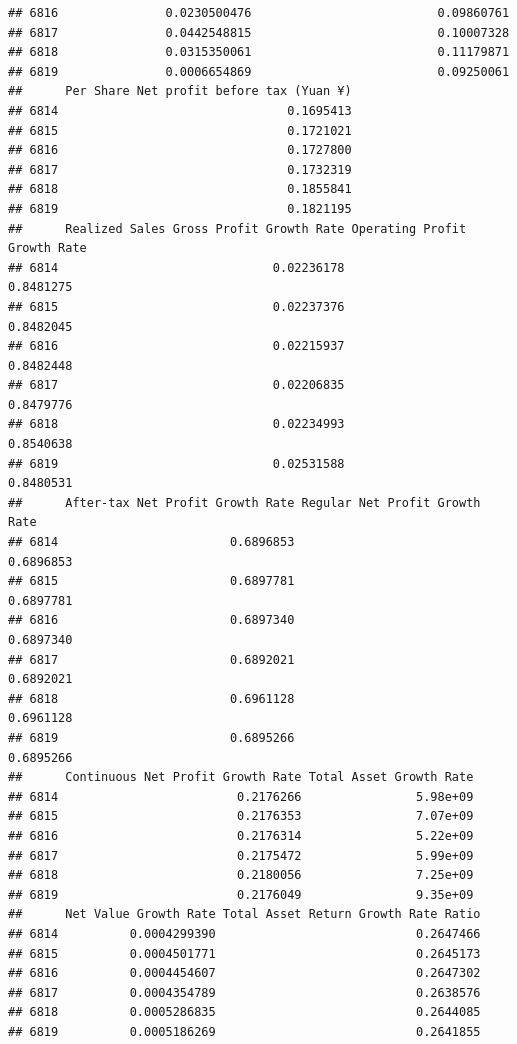 \documentclass[
]{book}
\begin{document}
\begin{verbatim}
## 6816               0.0230500476                          0.09860761
## 6817               0.0442548815                          0.10007328
## 6818               0.0315350061                          0.11179871
## 6819               0.0006654869                          0.09250061
##      Per Share Net profit before tax (Yuan ¥)
## 6814                                0.1695413
## 6815                                0.1721021
## 6816                                0.1727800
## 6817                                0.1732319
## 6818                                0.1855841
## 6819                                0.1821195
##      Realized Sales Gross Profit Growth Rate Operating Profit Growth Rate
## 6814                              0.02236178                    0.8481275
## 6815                              0.02237376                    0.8482045
## 6816                              0.02215937                    0.8482448
## 6817                              0.02206835                    0.8479776
## 6818                              0.02234993                    0.8540638
## 6819                              0.02531588                    0.8480531
##      After-tax Net Profit Growth Rate Regular Net Profit Growth Rate
## 6814                        0.6896853                      0.6896853
## 6815                        0.6897781                      0.6897781
## 6816                        0.6897340                      0.6897340
## 6817                        0.6892021                      0.6892021
## 6818                        0.6961128                      0.6961128
## 6819                        0.6895266                      0.6895266
##      Continuous Net Profit Growth Rate Total Asset Growth Rate
## 6814                         0.2176266                5.98e+09
## 6815                         0.2176353                7.07e+09
## 6816                         0.2176314                5.22e+09
## 6817                         0.2175472                5.99e+09
## 6818                         0.2180056                7.25e+09
## 6819                         0.2176049                9.35e+09
##      Net Value Growth Rate Total Asset Return Growth Rate Ratio
## 6814          0.0004299390                            0.2647466
## 6815          0.0004501771                            0.2645173
## 6816          0.0004454607                            0.2647302
## 6817          0.0004354789                            0.2638576
## 6818          0.0005286835                            0.2644085
## 6819          0.0005186269                            0.2641855

\end{verbatim}
\end{document}
